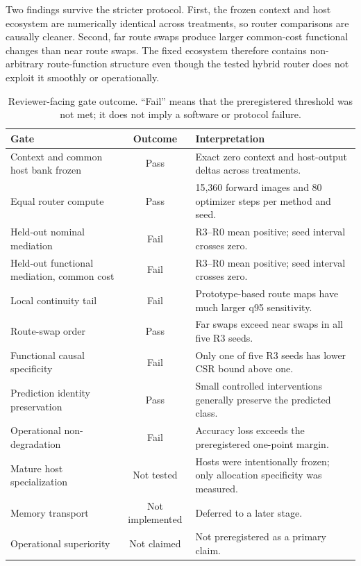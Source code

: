 \documentclass[11pt,a4paper]{article}
\begin{document}
\begin{positivebox}
Two findings survive the stricter protocol. First, the frozen context and host ecosystem are numerically identical across treatments, so router comparisons are causally cleaner. Second, far route swaps produce larger common-cost functional changes than near route swaps. The fixed ecosystem therefore contains non-arbitrary route-function structure even though the tested hybrid router does not exploit it smoothly or operationally.
\end{positivebox}

\begin{table}[H]
\centering
\caption{Reviewer-facing gate outcome. ``Fail'' means that the preregistered threshold was not met; it does not imply a software or protocol failure.}
\label{tab:gates}
\small
\begin{tabularx}{\textwidth}{@{}Y c Y@{}}
\toprule
Gate & Outcome & Interpretation \\
\midrule
Context and common host bank frozen & Pass & Exact zero context and host-output deltas across treatments. \\
Equal router compute & Pass & 15,360 forward images and 80 optimizer steps per method and seed. \\
Held-out nominal mediation & Fail & R3--R0 mean positive; seed interval crosses zero. \\
Held-out functional mediation, common cost & Fail & R3--R0 mean positive; seed interval crosses zero. \\
Local continuity tail & Fail & Prototype-based route maps have much larger q95 sensitivity. \\
Route-swap order & Pass & Far swaps exceed near swaps in all five R3 seeds. \\
Functional causal specificity & Fail & Only one of five R3 seeds has lower CSR bound above one. \\
Prediction identity preservation & Pass & Small controlled interventions generally preserve the predicted class. \\
Operational non-degradation & Fail & Accuracy loss exceeds the preregistered one-point margin. \\
Mature host specialization & Not tested & Hosts were intentionally frozen; only allocation specificity was measured. \\
Memory transport & Not implemented & Deferred to a later stage. \\
Operational superiority & Not claimed & Not preregistered as a primary claim. \\
\bottomrule
\end{tabularx}
\end{table}
\end{document}
